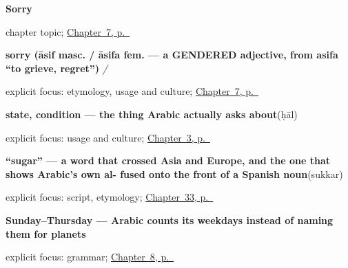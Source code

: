\noindent\begin{minipage}[t]{\linewidth}
\raggedright
\textbf{Sorry}\par
\footnotesize chapter topic; \hyperref[ch:ar-sorry]{Chapter~7, p.~\pageref*{ch:ar-sorry}}
\end{minipage}\par\smallskip

\noindent\begin{minipage}[t]{\linewidth}
\raggedright
\textbf{sorry (āsif masc. / āsifa fem. — a GENDERED adjective, from asifa \textquotedblleft{}to grieve, regret\textquotedblright{})}\enspace\emph{ / }\par
\footnotesize explicit focus: etymology, usage and culture; \hyperref[ch:ar-sorry]{Chapter~7, p.~\pageref*{ch:ar-sorry}}
\end{minipage}\par\smallskip

\noindent\begin{minipage}[t]{\linewidth}
\raggedright
\textbf{state, condition — the thing Arabic actually asks about}\enspace\emph{}\enspace(ḥāl)\par
\footnotesize explicit focus: usage and culture; \hyperref[ch:ar-how-are-you]{Chapter~3, p.~\pageref*{ch:ar-how-are-you}}
\end{minipage}\par\smallskip

\noindent\begin{minipage}[t]{\linewidth}
\raggedright
\textbf{\textquotedblleft{}sugar\textquotedblright{} — a word that crossed Asia and Europe, and the one that shows Arabic's own al- fused onto the front of a Spanish noun}\enspace\emph{}\enspace(sukkar)\par
\footnotesize explicit focus: script, etymology; \hyperref[ch:ar-asking-for-a-drink]{Chapter~33, p.~\pageref*{ch:ar-asking-for-a-drink}}
\end{minipage}\par\smallskip

\noindent\begin{minipage}[t]{\linewidth}
\raggedright
\textbf{Sunday–Thursday — Arabic counts its weekdays instead of naming them for planets}\enspace\emph{    }\par
\footnotesize explicit focus: grammar; \hyperref[ch:ar-days-of-the-week]{Chapter~8, p.~\pageref*{ch:ar-days-of-the-week}}
\end{minipage}\par\smallskip

